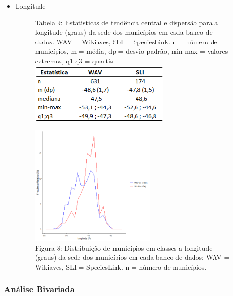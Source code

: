 \begin{itemize}
\item Longitude


\begin{figure}[h!]
\centering
{\scriptsize Tabela 9: Estatísticas de tendência central e dispersão para a longitude (graus) da sede dos municípios em cada banco de dados: WAV = Wikiaves, SLI = SpeciesLink. n = número de municípios, m = média, dp = desvio-padrão, min-max = valores extremos, q1-q3 = quartis.}
\\
\includegraphics[height = 3cm]{Tabelas/9.png}
\end{figure}


\begin{figure}[h!]
\centering
\includegraphics[height = 6cm]{Imagens/253.png}
\\{\scriptsize Figura 8: Distribuição de municípios em classes a longitude (graus) da sede dos municípios em cada banco de dados: WAV = Wikiaves, SLI = SpeciesLink. n = número de municípios.}
\end{figure}

\end{itemize}

\newpage

\subsubsection{Análise Bivariada}

